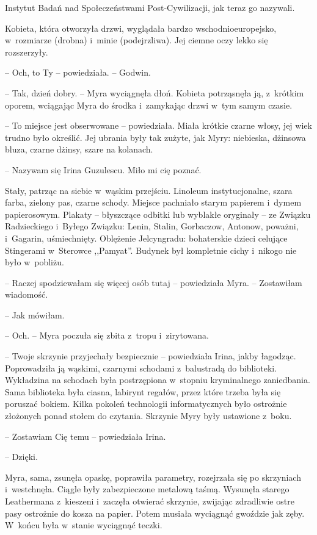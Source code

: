 \documentclass[oneside,polish,11pt,sfheadings]{mwbk}
\begin{document}
Instytut Badań nad Społeczeństwami Post-Cywilizacji, jak teraz go
nazywali.

Kobieta, która otworzyła drzwi, wyglądała bardzo wschodnioeuropejsko, w~rozmiarze (drobna) i~minie (podejrzliwa). Jej ciemne oczy lekko się
rozszerzyły.

-- Och, to Ty -- powiedziała. -- Godwin.

-- Tak, dzień dobry. -- Myra wyciągnęła dłoń. Kobieta potrząsnęła ją, z~krótkim oporem, wciągając Myra do środka i~zamykając drzwi w~tym samym
czasie.

-- To miejsce jest obserwowane -- powiedziała. Miała krótkie czarne włosy,
jej wiek trudno było określić. Jej ubrania były tak zużyte, jak Myry:
niebieska, dżinsowa bluza, czarne dżinsy, szare na kolanach. 

-- Nazywam
się Irina Guzulescu. Miło mi cię poznać.

Stały, patrząc na siebie w~wąskim przejściu. Linoleum instytucjonalne,
szara farba, zielony pas, czarne schody. Miejsce pachniało starym
papierem i~dymem papierosowym. Plakaty -- błyszczące odbitki lub wyblakłe
oryginały -- ze Związku Radzieckiego i~Byłego Związku: Lenin, Stalin,
Gorbaczow, Antonow, poważni, i~Gagarin, uśmiechnięty. Oblężenie
Jelcyngradu: bohaterskie dzieci celujące Stingerami w~Sterowce
,,Pamyat''. Budynek był kompletnie cichy i~nikogo nie było w~pobliżu.

-- Raczej spodziewałam się więcej osób tutaj -- powiedziała Myra. -- Zostawiłam wiadomość.

-- Jak mówiłam.

-- Och. -- Myra poczuła się zbita z~tropu i~zirytowana.

-- Twoje skrzynie przyjechały bezpiecznie -- powiedziała Irina, jakby
łagodząc. Poprowadziła ją wąskimi, czarnymi schodami z~balustradą do
biblioteki. Wykładzina na schodach była postrzępiona w~stopniu
kryminalnego zaniedbania. Sama biblioteka była ciasna, labirynt regałów,
przez które trzeba była się poruszać bokiem. Kilka pokoleń technologii
informatycznych było ostrożnie złożonych ponad stołem do czytania.
Skrzynie Myry były ustawione z~boku.

-- Zostawiam Cię temu -- powiedziała Irina.

-- Dzięki.

Myra, sama, zsunęła opaskę, poprawiła parametry, rozejrzała się po
skrzyniach i~westchnęła. Ciągle były zabezpieczone metalową taśmą.
Wysunęła starego Leathermana z~kieszeni i~zaczęła otwierać skrzynie,
zwijając zdradliwie ostre pasy ostrożnie do kosza na papier. Potem
musiała wyciągnąć gwoździe jak zęby. W~końcu była w~stanie wyciągnąć
teczki.
\end{document}
